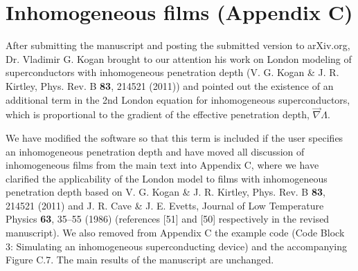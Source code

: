 \documentclass{article} %
\begin{document}
\section{Inhomogeneous films (Appendix C)}

After submitting the manuscript and posting the submitted version to arXiv.org, Dr. Vladimir G. Kogan brought to our attention his work on London modeling of superconductors with inhomogeneous penetration depth (V. G. Kogan \& J. R. Kirtley, Phys. Rev. B {\bf 83}, 214521 (2011)) and pointed out the existence of an additional term in the 2nd London equation for inhomogeneous superconductors, which is proportional to the gradient of the effective penetration depth, $\vec{\nabla}\Lambda$.

We have modified the software so that this term is included if the user specifies an inhomogeneous penetration depth and have moved all discussion of inhomogeneous films from the main text into Appendix C, where we have clarified the applicability of the London model to films with inhomogeneous penetration depth based on V. G. Kogan \& J. R. Kirtley, Phys. Rev. B {\bf 83}, 214521 (2011) and J. R. Cave \& J. E. Evetts, Journal of Low Temperature Physics {\bf 63}, 35–55 (1986) (references [51] and [50] respectively in the revised manuscript). We also removed from Appendix C the example code (Code Block 3: Simulating an inhomogeneous superconducting device) and the accompanying Figure C.7. The main results of the manuscript are unchanged.
\end{document}
